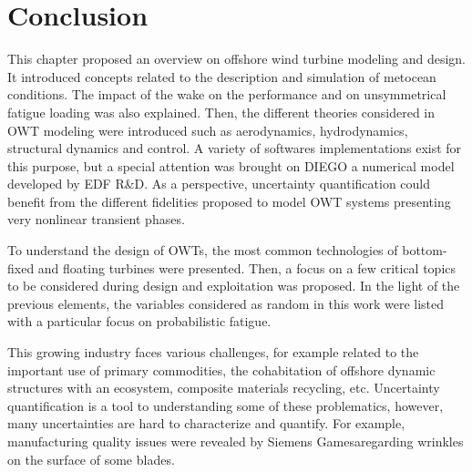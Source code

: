 \section{Conclusion}

This chapter proposed an overview on offshore wind turbine modeling and design. 
It introduced concepts related to the description and simulation of metocean conditions. 
The impact of the wake on the performance and on unsymmetrical fatigue loading was also explained.  
Then, the different theories considered in OWT modeling were introduced such as aerodynamics, hydrodynamics, structural dynamics and control. 
A variety of softwares implementations exist for this purpose, but a special attention was brought on DIEGO a numerical model developed by EDF R\&D. 
As a perspective, uncertainty quantification could benefit from the different fidelities proposed to model OWT systems presenting very nonlinear transient phases. 

To understand the design of OWTs, the most common technologies of bottom-fixed and floating turbines were presented. 
Then, a focus on a few critical topics to be considered during design and exploitation was proposed. 
In the light of the previous elements, the variables considered as random in this work were listed with a particular focus on probabilistic fatigue.   

This growing industry faces various challenges, for example related to the important use of primary commodities, the cohabitation of offshore dynamic structures with an ecosystem, composite materials recycling, etc. 
Uncertainty quantification is a tool to understanding some of these problematics, however, many uncertainties are hard to characterize and quantify. 
For example, manufacturing quality issues were revealed by Siemens Gamesa\footnotemark regarding wrinkles on the surface of some blades. 



